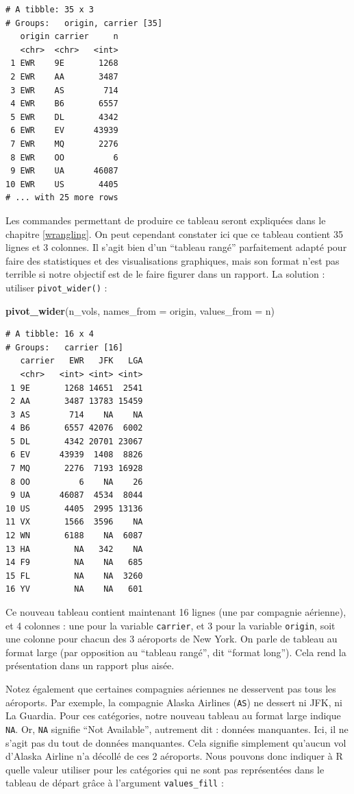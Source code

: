 \documentclass[
  a4paper,
]{article}
\newenvironment{Shaded}{\begin{snugshade}}{\end{snugshade}}
\newcommand{\DataTypeTok}[1]{\textcolor[rgb]{0.00,0.34,0.68}{#1}}
\newcommand{\KeywordTok}[1]{\textcolor[rgb]{0.12,0.11,0.11}{\textbf{#1}}}
\newcommand{\NormalTok}[1]{\textcolor[rgb]{0.12,0.11,0.11}{#1}}
\begin{document}
\begin{verbatim}
# A tibble: 35 x 3
# Groups:   origin, carrier [35]
   origin carrier     n
   <chr>  <chr>   <int>
 1 EWR    9E       1268
 2 EWR    AA       3487
 3 EWR    AS        714
 4 EWR    B6       6557
 5 EWR    DL       4342
 6 EWR    EV      43939
 7 EWR    MQ       2276
 8 EWR    OO          6
 9 EWR    UA      46087
10 EWR    US       4405
# ... with 25 more rows
\end{verbatim}

Les commandes permettant de produire ce tableau seront expliquées dans le chapitre \ref{wrangling}. On peut cependant constater ici que ce tableau contient 35 lignes et 3 colonnes. Il s'agit bien d'un ``tableau rangé'' parfaitement adapté pour faire des statistiques et des visualisations graphiques, mais son format n'est pas terrible si notre objectif est de le faire figurer dans un rapport. La solution : utiliser \texttt{pivot\_wider()} :

\begin{Shaded}
\begin{Highlighting}[]
\KeywordTok{pivot_wider}\NormalTok{(n_vols, }
            \DataTypeTok{names_from =}\NormalTok{ origin, }
            \DataTypeTok{values_from =}\NormalTok{ n)}
\end{Highlighting}
\end{Shaded}

\begin{verbatim}
# A tibble: 16 x 4
# Groups:   carrier [16]
   carrier   EWR   JFK   LGA
   <chr>   <int> <int> <int>
 1 9E       1268 14651  2541
 2 AA       3487 13783 15459
 3 AS        714    NA    NA
 4 B6       6557 42076  6002
 5 DL       4342 20701 23067
 6 EV      43939  1408  8826
 7 MQ       2276  7193 16928
 8 OO          6    NA    26
 9 UA      46087  4534  8044
10 US       4405  2995 13136
11 VX       1566  3596    NA
12 WN       6188    NA  6087
13 HA         NA   342    NA
14 F9         NA    NA   685
15 FL         NA    NA  3260
16 YV         NA    NA   601
\end{verbatim}

Ce nouveau tableau contient maintenant 16 lignes (une par compagnie aérienne), et 4 colonnes : une pour la variable \texttt{carrier}, et 3 pour la variable \texttt{origin}, soit une colonne pour chacun des 3 aéroports de New York. On parle de tableau au format large (par opposition au ``tableau rangé'', dit ``format long''). Cela rend la présentation dans un rapport plus aisée.

Notez également que certaines compagnies aériennes ne desservent pas tous les aéroports. Par exemple, la compagnie Alaska Airlines (\texttt{AS}) ne dessert ni JFK, ni La Guardia. Pour ces catégories, notre nouveau tableau au format large indique \texttt{NA}. Or, \texttt{NA} signifie ``Not Available'', autrement dit : données manquantes. Ici, il ne s'agit pas du tout de données manquantes. Cela signifie simplement qu'aucun vol d'Alaska Airline n'a décollé de ces 2 aéroports. Nous pouvons donc indiquer à R quelle valeur utiliser pour les catégories qui ne sont pas représentées dans le tableau de départ grâce à l'argument \texttt{values\_fill} :
\end{document}
